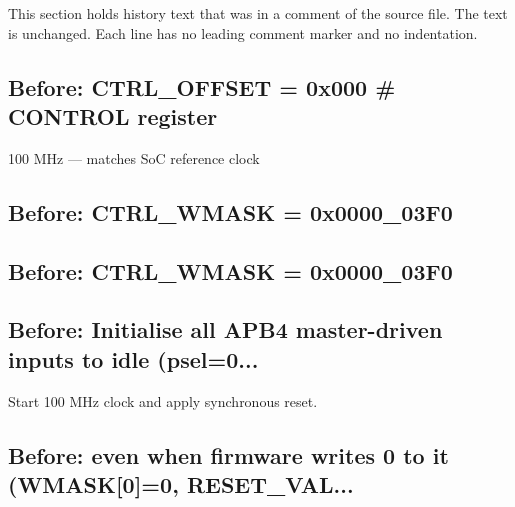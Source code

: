 This section holds history text that was in a comment of the source file. The text is unchanged. Each line has no leading comment marker and no indentation.

\begin{record}

\subsection*{Before: CTRL\_OFFSET  = 0x000   \# CONTROL register}

\begin{textblock}
100 MHz — matches SoC reference clock
\end{textblock}

\subsection*{Before: CTRL\_WMASK = 0x0000\_03F0}


\subsection*{Before: CTRL\_WMASK = 0x0000\_03F0}


\subsection*{Before: Initialise all APB4 master-driven inputs to idle (psel=0...}

\begin{textblock}
Start 100 MHz clock and apply synchronous reset.
\end{textblock}

\subsection*{Before: even when firmware writes 0 to it (WMASK[0]=0, RESET\_VAL...}



\end{record}
